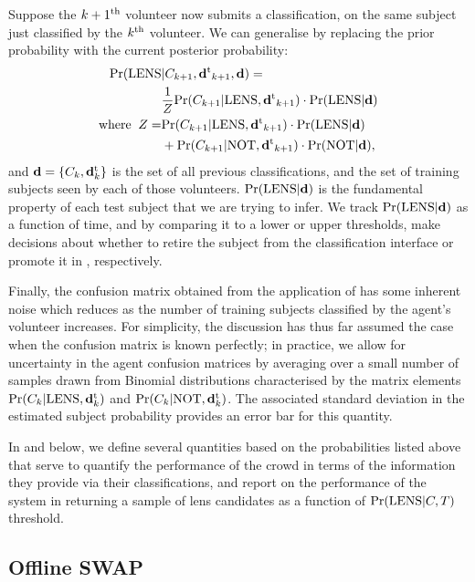 \documentclass[useAMS,usenatbib,a4paper]{mn2e}
\begin{document}
Suppose the $k+1^{\rm th}$ volunteer now submits a classification, on the same
subject just classified by the $k^{\rm th}$ volunteer. We can generalise
 by replacing the prior probability with the current
posterior probability:
\begin{align}
  \label{eq:app:update}
  {\rm Pr}({\rm LENS} & |C_{k+1},{\mathbf{d}^{\rm t}}_{k+1},{\mathbf{d}}) = \\
  & \frac{1}{Z} {\rm Pr}(C_{k+1}|{\rm LENS},{\mathbf{d}^{\rm t}}_{k+1}) \cdot {\rm Pr}({\rm LENS}|{\mathbf{d}}) \\ \notag
{\rm where}\;\; Z = & {\rm Pr}(C_{k+1}|{\rm LENS},{\mathbf{d}^{\rm t}}_{k+1})\cdot{\rm Pr}({\rm LENS}|{\mathbf{d}}) \\ \notag
      & + {\rm Pr}(C_{k+1}|{\rm NOT},{\mathbf{d}^{\rm t}}_{k+1})\cdot{\rm Pr}({\rm NOT}|{\mathbf{d}}), \notag
\end{align}
and ${\mathbf{d}} = \{C_k,{\mathbf{d}^{\rm t}_k}\}$ is the set of all previous
classifications, and the set of training subjects seen by each of those
volunteers.
${\rm Pr}({\rm LENS}|{\mathbf{d}})$ is the fundamental property of each test subject that
we are trying to infer. We track ${\rm Pr}({\rm LENS}|{\mathbf{d}})$ as a function of time,
and by comparing it to a lower or upper thresholds, make decisions about
whether to retire the subject from the classification interface or
promote it in \Talk, respectively.

Finally, the confusion matrix obtained from the application of
 has some inherent noise which reduces as the
number of training subjects classified by the agent's volunteer
increases. For simplicity, the discussion has thus far assumed the case
when the confusion matrix is known perfectly; in practice, we allow for
uncertainty in the agent confusion matrices by averaging over a small
number of samples drawn from Binomial distributions characterised by the
matrix elements ${\rm Pr}(C_k|{\rm LENS},{\mathbf{d}^{\rm t}_k})$ and  ${\rm Pr}(C_k|{\rm NOT},{\mathbf{d}^{\rm t}_k})$. The
associated standard deviation in the estimated subject probability
provides an error bar for this quantity.

In  and  below, we define several
quantities based on the probabilities listed above that serve to quantify the
performance of the crowd in terms of the information they provide via their
classifications, and report on the performance of the system in returning a
sample of lens candidates as a function of ${\rm Pr}({\rm LENS}|C,T)$ threshold.



\subsection{Offline SWAP}
\label{sec:swap:offline}
\end{document}

